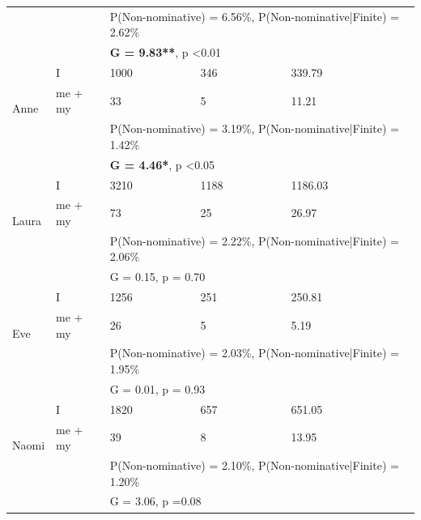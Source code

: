 \begin{table}[!h]
\begin{tabular}{lllll}
 &  & \multicolumn{3}{l}{P(Non-nominative) = 6.56\%, P(Non-nominative|Finite) = 2.62\%}\\
 & & \multicolumn{3}{l}{\textbf{G = 9.83**}, p \textless 0.01} \\ \hline
\multirow{3}{*}{Anne} & I & 1000 & 346 & 339.79 \\ \cline{2-5} 
 & me + my & 33 & 5 & 11.21 \\ \cline{2-5} 
 &  & \multicolumn{3}{l}{P(Non-nominative) = 3.19\%, P(Non-nominative|Finite) = 1.42\%}\\
 & & \multicolumn{3}{l}{\textbf{G = 4.46*}, p \textless 0.05} \\ \hline
\multirow{3}{*}{Laura} & I & 3210 & 1188 & 1186.03 \\ \cline{2-5} 
 & me + my & 73 & 25 & 26.97 \\ \cline{2-5} 
 &  & \multicolumn{3}{l}{P(Non-nominative) = 2.22\%, P(Non-nominative|Finite) = 2.06\%} \\
 & & \multicolumn{3}{l}{G = 0.15, p = 0.70} \\ \hline
\multirow{3}{*}{Eve} & I & 1256 & 251 & 250.81 \\ \cline{2-5} 
 & me + my & 26 & 5 & 5.19 \\ \cline{2-5} 
 &  & \multicolumn{3}{l}{P(Non-nominative) = 2.03\%, P(Non-nominative|Finite) = 1.95\%} \\
 & & \multicolumn{3}{l}{G = 0.01, p = 0.93} \\ \hline
\multirow{3}{*}{Naomi} & I & 1820 & 657 & 651.05 \\ \cline{2-5} 
 & me + my & 39 & 8 & 13.95 \\ \cline{2-5} 
 &  & \multicolumn{3}{l}{P(Non-nominative) = 2.10\%, P(Non-nominative|Finite) = 1.20\%} \\
 & & \multicolumn{3}{l}{G = 3.06, p =0.08}\\
 \bottomrule
\end{tabular}
\end{table}
\FloatBarrier


